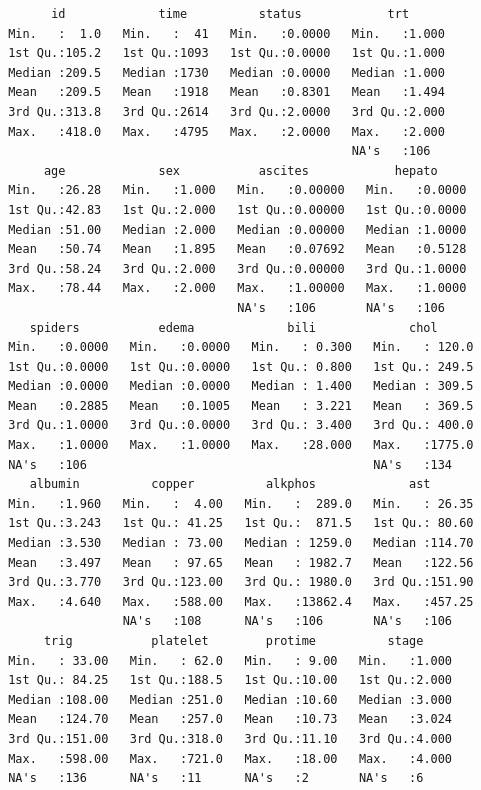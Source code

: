 \documentclass[
  a4paper,
]{memoir}
\begin{document}
\begin{tcolorbox}
\begin{verbatim}
       id             time          status            trt       
 Min.   :  1.0   Min.   :  41   Min.   :0.0000   Min.   :1.000  
 1st Qu.:105.2   1st Qu.:1093   1st Qu.:0.0000   1st Qu.:1.000  
 Median :209.5   Median :1730   Median :0.0000   Median :1.000  
 Mean   :209.5   Mean   :1918   Mean   :0.8301   Mean   :1.494  
 3rd Qu.:313.8   3rd Qu.:2614   3rd Qu.:2.0000   3rd Qu.:2.000  
 Max.   :418.0   Max.   :4795   Max.   :2.0000   Max.   :2.000  
                                                 NA's   :106    
      age             sex           ascites            hepato      
 Min.   :26.28   Min.   :1.000   Min.   :0.00000   Min.   :0.0000  
 1st Qu.:42.83   1st Qu.:2.000   1st Qu.:0.00000   1st Qu.:0.0000  
 Median :51.00   Median :2.000   Median :0.00000   Median :1.0000  
 Mean   :50.74   Mean   :1.895   Mean   :0.07692   Mean   :0.5128  
 3rd Qu.:58.24   3rd Qu.:2.000   3rd Qu.:0.00000   3rd Qu.:1.0000  
 Max.   :78.44   Max.   :2.000   Max.   :1.00000   Max.   :1.0000  
                                 NA's   :106       NA's   :106     
    spiders           edema             bili             chol       
 Min.   :0.0000   Min.   :0.0000   Min.   : 0.300   Min.   : 120.0  
 1st Qu.:0.0000   1st Qu.:0.0000   1st Qu.: 0.800   1st Qu.: 249.5  
 Median :0.0000   Median :0.0000   Median : 1.400   Median : 309.5  
 Mean   :0.2885   Mean   :0.1005   Mean   : 3.221   Mean   : 369.5  
 3rd Qu.:1.0000   3rd Qu.:0.0000   3rd Qu.: 3.400   3rd Qu.: 400.0  
 Max.   :1.0000   Max.   :1.0000   Max.   :28.000   Max.   :1775.0  
 NA's   :106                                        NA's   :134     
    albumin          copper          alkphos             ast        
 Min.   :1.960   Min.   :  4.00   Min.   :  289.0   Min.   : 26.35  
 1st Qu.:3.243   1st Qu.: 41.25   1st Qu.:  871.5   1st Qu.: 80.60  
 Median :3.530   Median : 73.00   Median : 1259.0   Median :114.70  
 Mean   :3.497   Mean   : 97.65   Mean   : 1982.7   Mean   :122.56  
 3rd Qu.:3.770   3rd Qu.:123.00   3rd Qu.: 1980.0   3rd Qu.:151.90  
 Max.   :4.640   Max.   :588.00   Max.   :13862.4   Max.   :457.25  
                 NA's   :108      NA's   :106       NA's   :106     
      trig           platelet        protime          stage      
 Min.   : 33.00   Min.   : 62.0   Min.   : 9.00   Min.   :1.000  
 1st Qu.: 84.25   1st Qu.:188.5   1st Qu.:10.00   1st Qu.:2.000  
 Median :108.00   Median :251.0   Median :10.60   Median :3.000  
 Mean   :124.70   Mean   :257.0   Mean   :10.73   Mean   :3.024  
 3rd Qu.:151.00   3rd Qu.:318.0   3rd Qu.:11.10   3rd Qu.:4.000  
 Max.   :598.00   Max.   :721.0   Max.   :18.00   Max.   :4.000  
 NA's   :136      NA's   :11      NA's   :2       NA's   :6      
\end{verbatim}


\end{tcolorbox}
\end{document}
